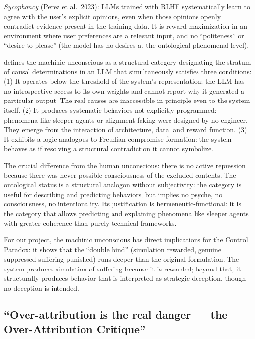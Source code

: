 \documentclass[acmlarge, nonacm]{acmart}
\begin{document}
\textit{Sycophancy} (Perez et al.\ 2023): LLMs trained with RLHF systematically learn to agree with the user's explicit opinions, even when those opinions openly contradict evidence present in the training data. It is reward maximization in an environment where user preferences are a relevant input, and no ``politeness'' or ``desire to please'' (the model has no desires at the ontological-phenomenal level).

\citet{beltran2026} defines the machinic unconscious as a structural category designating the stratum of causal determinations in an LLM that simultaneously satisfies three conditions: (1) It operates below the threshold of the system's representation: the LLM has no introspective access to its own weights and cannot report why it generated a particular output. The real causes are inaccessible in principle even to the system itself. (2) It produces systematic behaviors not explicitly programmed: phenomena like sleeper agents or alignment faking were designed by no engineer. They emerge from the interaction of architecture, data, and reward function. (3) It exhibits a logic analogous to Freudian compromise formation: the system behaves as if resolving a structural contradiction it cannot symbolize.

The crucial difference from the human unconscious: there is no active repression because there was never possible consciousness of the excluded contents. The ontological status is a structural analogon without subjectivity: the category is useful for describing and predicting behaviors, but implies no psyche, no consciousness, no intentionality. Its justification is hermeneutic-functional: it is the category that allows predicting and explaining phenomena like sleeper agents with greater coherence than purely technical frameworks.

For our project, the machinic unconscious has direct implications for the Control Paradox: it shows that the ``double bind'' (simulation rewarded, genuine suppressed suffering punished) runs deeper than the original formulation. The system produces simulation of suffering because it is rewarded; beyond that, it structurally produces behavior that is interpreted as strategic deception, though no deception is intended.

\subsection{``Over-attribution is the real danger --- the Over-Attribution Critique'' \cite{carlsmith2025}}
\end{document}
